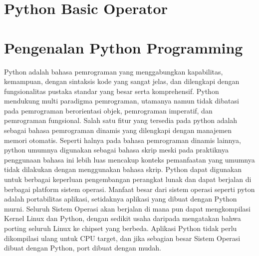 
\section{Python Basic Operator}
\section{Pengenalan Python Programming}
Python adalah bahasa pemrograman yang menggabungkan kapabilitas, kemampuan, dengan sintaksis kode yang sangat jelas, dan dilengkapi dengan fungsionalitas pustaka standar yang besar serta komprehensif. Python mendukung multi paradigma pemrograman, utamanya namun tidak dibatasi pada pemrograman berorientasi objek, pemrograman imperatif, dan pemrograman fungsional. Salah satu fitur yang tersedia pada python adalah sebagai bahasa pemrograman dinamis yang dilengkapi dengan manajemen memori otomatis. Seperti halnya pada bahasa pemrograman dinamis lainnya, python umumnya digunakan sebagai bahasa skrip meski pada praktiknya penggunaan bahasa ini lebih luas mencakup konteks pemanfaatan yang umumnya tidak dilakukan dengan menggunakan bahasa skrip. Python dapat digunakan untuk berbagai keperluan pengembangan perangkat lunak dan dapat berjalan di berbagai platform sistem operasi. Manfaat besar dari sistem operasi seperti pyton adalah portabilitas aplikasi, setidaknya aplikasi yang dibuat dengan Python murni. Seluruh Sistem Operasi akan berjalan di mana pun dapat mengkompilasi Kernel Linux dan Python, dengan sedikit usaha daripada mengatakan bahwa porting seluruh Linux ke chipset yang berbeda. Aplikasi Python tidak perlu dikompilasi ulang untuk CPU target, dan jika sebagian besar Sistem Operasi dibuat dengan Python, port dibuat dengan mudah.

